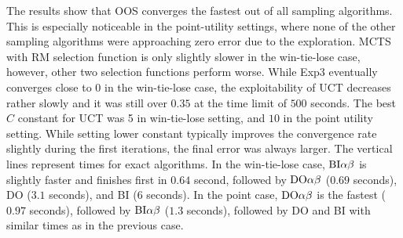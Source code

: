 The results show that OOS converges the fastest out of all sampling algorithms.
This is especially noticeable in the point-utility settings, where none of the other sampling algorithms were approaching zero error due to the exploration.
MCTS with RM selection function is only slightly slower in the win-tie-lose case, however, other two selection functions perform worse.
While Exp3 eventually converges close to $0$ in the win-tie-lose case, the exploitability of UCT decreases rather slowly and it was still over $0.35$ at the time limit of $500$ seconds.
The best $C$ constant for UCT was 5 in win-tie-lose setting, and $10$ in the point utility setting.
While setting lower constant typically improves the convergence rate slightly during the first iterations, the final error was always larger.
The vertical lines represent times for exact algorithms.
In the win-tie-lose case, $\textrm{BI}\alpha\beta$ is slightly faster and finishes first in $0.64$ second, followed by $\textrm{DO}\alpha\beta$ ($0.69$ seconds), \textsc{DO} ($3.1$ seconds), and \textsc{BI} ($6$ seconds).
In the point case, $\textrm{DO}\alpha\beta$ is the fastest ($0.97$ seconds), followed by $\textrm{BI}\alpha\beta$ ($1.3$ seconds), followed by \textsc{DO} and \textsc{BI} with similar times as in the previous case.

